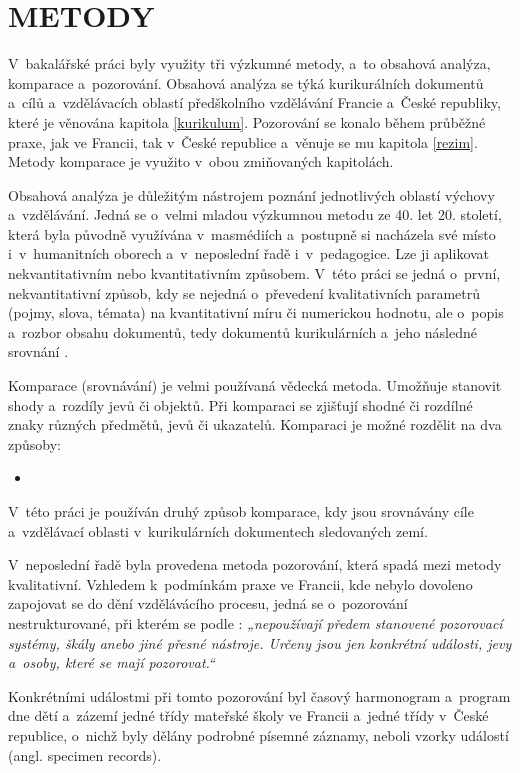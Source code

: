 
\chapter{METODY}
\label{metody}

V~bakalářské práci byly využity tři výzkumné metody, a~to obsahová analýza, komparace a~pozorování. Obsahová analýza se týká kurikurálních dokumentů a cílů a~vzdělávacích oblastí předškolního vzdělávání Francie a~České republiky, které je věnována kapitola \ref{kurikulum}. Pozorování se konalo během průběžné praxe, jak ve Francii, tak v České republice a~věnuje se mu kapitola \ref{rezim}. Metody komparace je využito v~obou zmiňovaných kapitolách. 

Obsahová analýza je důležitým nástrojem poznání jednotlivých oblastí výchovy a vzdělávání. Jedná se o~velmi mladou výzkumnou metodu ze 40. let 20. století, která byla původně využívána v masmédiích a~postupně si nacházela své místo i v humanitních oborech a~v neposlední řadě i~v pedagogice. Lze ji aplikovat nekvantitativním nebo kvantitativním způsobem. V této práci se jedná o~první, nekvantitativní způsob, kdy se nejedná o~převedení kvalitativních parametrů (pojmy, slova, témata) na kvantitativní míru či numerickou hodnotu, ale o~popis a~rozbor obsahu dokumentů, tedy dokumentů kurikulárních a~jeho následné srovnání \citep{Gavora08}.

Komparace (srovnávání) je velmi používaná vědecká metoda. Umožňuje stanovit shody a~rozdíly jevů či objektů. Při komparaci se zjišťují shodné či rozdílné znaky různých předmětů, jevů či ukazatelů. 
Komparaci je možné rozdělit na dva způsoby: \citep[s.~19]{Siroky}
\begin{itemize}
\item [] 
\end{itemize}
V~této práci je používán druhý způsob komparace, kdy jsou srovnávány cíle a~vzdělávací oblasti v~kurikulárních dokumentech sledovaných zemí.  

V~neposlední řadě byla provedena metoda pozorování, která spadá mezi metody kvalitativní. Vzhledem k podmínkám praxe ve Francii, kde nebylo dovoleno zapojovat se do dění vzdělávácího procesu, jedná se o~pozorování nestrukturované, při kterém se podle \citet[s.~17]{Gavora96}: \textit{„nepoužívají předem stanovené pozorovací systémy, škály anebo jiné přesné nástroje. Určeny jsou jen konkrétní události, jevy a~osoby, které se mají pozorovat.“} 

Konkrétními událostmi při tomto pozorování byl časový harmonogram a~program dne dětí a~zázemí jedné třídy mateřské školy ve Francii a~jedné třídy v České republice, o~nichž byly dělány podrobné písemné záznamy, neboli vzorky událostí (angl. specimen records). 
